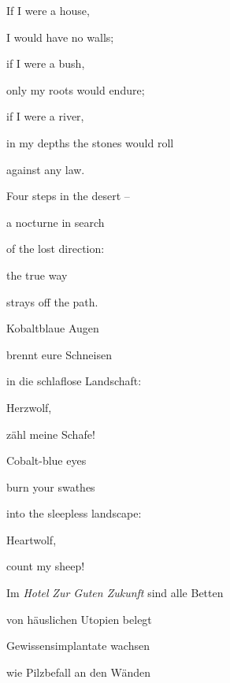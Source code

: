 \documentclass[a4paper]{article}
\begin{document}
{\color{black}
If I were a house,}

{\color{black}
I would have no walls;}

{\color{black}
if I were a bush,}

{\color{black}
only my roots would endure;}

{\color{black}
if I were a river,}

{\color{black}
in my depths the stones would roll}

{\color{black}
against any law.}


\bigskip

{\color{black}
Four steps in the desert – }

{\color{black}
a nocturne in search}

{\color{black}
of the lost direction:}

{\color{black}
the true way}

{\color{black}
strays off the path.}


\bigskip



\bigskip

Kobaltblaue Augen

brennt eure Schneisen

in die schlaflose Landschaft:


\bigskip

Herzwolf,

zähl meine Schafe!


\bigskip



\bigskip

Cobalt-blue eyes 

burn your swathes

into the sleepless landscape:


\bigskip

Heartwolf,

count my sheep!


\bigskip


\bigskip



\bigskip

Im \textit{Hotel} \textit{Zur Guten Zukunft} sind alle Betten

von häuslichen Utopien belegt

Gewissensimplantate wachsen 

wie Pilzbefall an den Wänden
\end{document}
